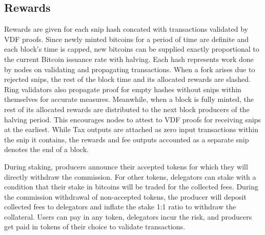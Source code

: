 \documentclass[../Bitcoin Blink.tex]{subfiles}
\begin{document}
\subsection{Rewards}
Rewards are given for each snip hash concated with transactions validated by VDF proofs. Since newly minted bitcoins for a period of time are definite and each block's time is capped, new bitcoins can be supplied exactly proportional to the current Bitcoin issuance rate with halving. Each hash represents work done by nodes on validating and propagating transactions. When a fork arises due to rejected snips, the rest of the block time and its allocated rewards are slashed. Ring validators also propagate proof for empty hashes without snips within themselves for accurate measures. Meanwhile, when a block is fully minted, the rest of its allocated rewards are distributed to the next block producers of the halving period. This encourages nodes to attest to VDF proofs for receiving snips at the earliest. While Tax outputs are attached as zero input transactions within the snip it contains, the rewards and fee outputs accounted as a separate snip denotes the end of a block. 

During staking, producers announce their accepted tokens for which they will directly withdraw the commission. For other tokens, delegators can stake with a condition that their stake in bitcoins will be traded for the collected fees. During the commission withdrawal of non-accepted tokens, the producer will deposit collected fees to delegators and inflate the stake 1:1 ratio to withdraw the collateral. Users can pay in any token, delegators incur the risk, and producers get paid in tokens of their choice to validate transactions.
\end{document}
